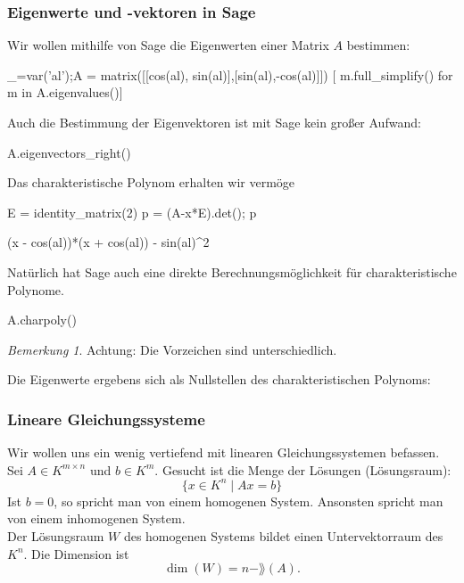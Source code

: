 \documentclass[fontsize=12pt,paper=a4,twoside,bibtotoc,idxtotoc,
liststotoc,pagesize,BCOR1.2cm,DIV15,chapterprefix,pagesize=pdftex]{scrbook}
\theoremstyle{plain}
\theoremstyle{definition}
\theoremstyle{remark}
\newtheorem{bem}[equation]{Bemerkung}
\begin{document}
\subsubsection{Eigenwerte und -vektoren in Sage}
Wir wollen mithilfe von Sage die Eigenwerten einer Matrix $A$ bestimmen:
\begin{sagein}
_=var('al');A = matrix([[cos(al), sin(al)],[sin(al),-cos(al)]])
[ m.full_simplify() for m in  A.eigenvalues()]
\end{sagein}
\begin{sageout}
  [-1, 1]
\end{sageout}
Auch die Bestimmung der Eigenvektoren ist mit Sage kein großer Aufwand:
\begin{sagein}
A.eigenvectors_right()
\end{sagein}
Das charakteristische Polynom erhalten wir vermöge
\begin{sagein}
E = identity_matrix(2)
p = (A-x*E).det(); p
\end{sagein}
\begin{sageout}
(x - cos(al))*(x + cos(al)) - sin(al)^2
\end{sageout}
Natürlich hat Sage auch eine direkte Berechnungsmöglichkeit für charakteristische Polynome.
\begin{sagein}
A.charpoly() 
\end{sagein}
\begin{bem}
 Achtung: Die Vorzeichen sind unterschiedlich.
\end{bem}
Die Eigenwerte ergebens sich als Nullstellen des charakteristischen Polynoms:
\begin{sagein}
[m.full_simplify() for m in solve(p==0,x)]
\end{sagein}
\begin{sageout}
  [x == -1, x == 1]
\end{sageout}
\subsubsection{Lineare Gleichungssysteme}
Wir wollen uns ein wenig vertiefend mit linearen Gleichungssystemen befassen.
Sei $A\in K^{m \times n}$ und $b \in K^m$. Gesucht ist die Menge der
Lösungen (Lösungsraum): 
\[ \{ x \in K^n \;|\; A x = b\} \]
Ist $b=0$, so spricht man von einem homogenen System. Ansonsten spricht man von einem inhomogenen System.\\
Der Lösungsraum $W$ des homogenen Systems bildet einen
Untervektorraum des $K^n$. Die Dimension ist 
\[ \dim (W)=n - \rang(A). \] 
\end{document}
